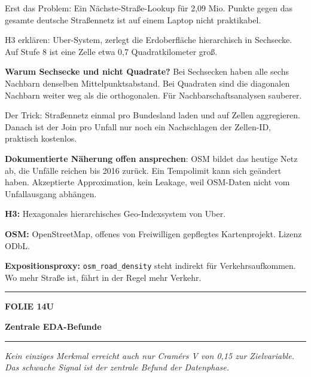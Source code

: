 \documentclass[9pt]{extarticle}
\newcommand{\karte}[3]{%
  \clearpage
  {\color{Accent}\rule{\linewidth}{2.4pt}}\par\vspace{2.5pt}
  {\fontsize{8}{9}\selectfont\bfseries\color{Accent}%
   FOLIE #1\hspace{1.2em}\textbar\hspace{1.2em}#2}\par\vspace{1pt}
  {\fontsize{16}{18}\selectfont\bfseries\color{AccentDark}#3}\par\vspace{3pt}
  {\color{Accent!45}\rule{\linewidth}{0.5pt}}\par\vspace{4pt}%
}
\newcommand{\rubrik}[1]{%
  \vspace{3.5pt}{\fontsize{7.5}{8.5}\selectfont\bfseries\color{Grau}%
  \MakeUppercase{#1}}\par\vspace{1.5pt}}
\newcommand{\kernsatz}[1]{%
  \begin{tcolorbox}[enhanced,sharp corners,boxrule=0pt,
    leftrule=2.2pt,colframe=Accent,colback=AccentPale,
    left=5pt,right=5pt,top=3.5pt,bottom=3.5pt,before skip=1pt,after skip=2pt]
    \color{AccentDark}\itshape #1
  \end{tcolorbox}}
\newcommand{\bg}[2]{\item \textbf{#1:} #2}
\begin{document}
\rubrik{Sagen}
\begin{sag}
  \item Erst das Problem: Ein Nächste-Straße-Lookup für 2,09 Mio. Punkte gegen das gesamte
        deutsche Straßennetz ist auf einem Laptop nicht praktikabel.
  \item H3 erklären: Uber-System, zerlegt die Erdoberfläche hierarchisch in Sechsecke.
        Auf Stufe 8 ist eine Zelle etwa 0,7 Quadratkilometer groß.
  \item \textbf{Warum Sechsecke und nicht Quadrate?} Bei Sechsecken haben alle sechs Nachbarn
        denselben Mittelpunktsabstand. Bei Quadraten sind die diagonalen Nachbarn weiter weg
        als die orthogonalen. Für Nachbarschaftsanalysen sauberer.
  \item Der Trick: Straßennetz einmal pro Bundesland laden und auf Zellen aggregieren. Danach
        ist der Join pro Unfall nur noch ein Nachschlagen der Zellen-ID, praktisch kostenlos.
  \item \textbf{Dokumentierte Näherung offen ansprechen}: OSM bildet das heutige Netz ab, die
        Unfälle reichen bis 2016 zurück. Ein Tempolimit kann sich geändert haben. Akzeptierte
        Approximation, kein Leakage, weil OSM-Daten nicht vom Unfallausgang abhängen.
\end{sag}

\rubrik{Begriffe}
\begin{begriff}
  \bg{H3}{Hexagonales hierarchisches Geo-Indexsystem von Uber.}
  \bg{OSM}{OpenStreetMap, offenes von Freiwilligen gepflegtes Kartenprojekt. Lizenz ODbL.}
  \bg{Expositionsproxy}{\texttt{osm\_road\_density} steht indirekt für Verkehrsaufkommen.
      Wo mehr Straße ist, fährt in der Regel mehr Verkehr.}
\end{begriff}

\karte{14}{U}{Zentrale EDA-Befunde}

\kernsatz{Kein einziges Merkmal erreicht auch nur Cram\'ers V von 0,15 zur Zielvariable.
Das schwache Signal ist der zentrale Befund der Datenphase.}
\end{document}
